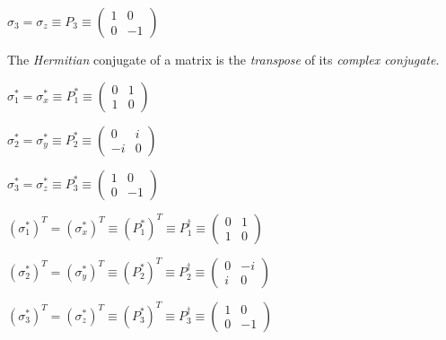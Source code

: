 \documentclass[fleqn]{article}
\begin{document}
\begin{enumerate}
  $\sigma_3=\sigma_z\equiv P_3 \equiv
  \begin{pmatrix}
    1 & 0 \\
    0 & -1 
  \end{pmatrix}
  $

  The \emph{Hermitian} conjugate of a matrix is the \emph{transpose} of its \emph{complex conjugate}.

  \bigbreak

  $\sigma_1^*=\sigma_x^* \equiv P_1^* \equiv
  \begin{pmatrix}
    0 & 1 \\
    1 & 0 
  \end{pmatrix}
  $

  $\sigma_2^*=\sigma_y^* \equiv P_2^* \equiv
  \begin{pmatrix}
    0 & i \\
    -i & 0 
  \end{pmatrix}
  $

  $\sigma_3^*=\sigma_z^* \equiv P_3^* \equiv
  \begin{pmatrix}
    1 & 0 \\
    0 & -1 
  \end{pmatrix}
  $

  \bigbreak

  $(\sigma_1^*)^T=(\sigma_x^*)^T \equiv (P_1^*)^T \equiv P_1^\dagger \equiv
  \begin{pmatrix}
    0 & 1 \\
    1 & 0 
  \end{pmatrix}
  $

  $(\sigma_2^*)^T=(\sigma_y^*)^T \equiv (P_2^*)^T \equiv P_2^\dagger \equiv
  \begin{pmatrix}
    0 & -i \\
    i & 0 
  \end{pmatrix}
  $

  $(\sigma_3^*)^T=(\sigma_z^*)^T \equiv (P_3^*)^T \equiv P_3^\dagger \equiv
  \begin{pmatrix}
    1 & 0 \\
    0 & -1 
  \end{pmatrix}
  $

  
  
  \end{enumerate}
\end{document}
